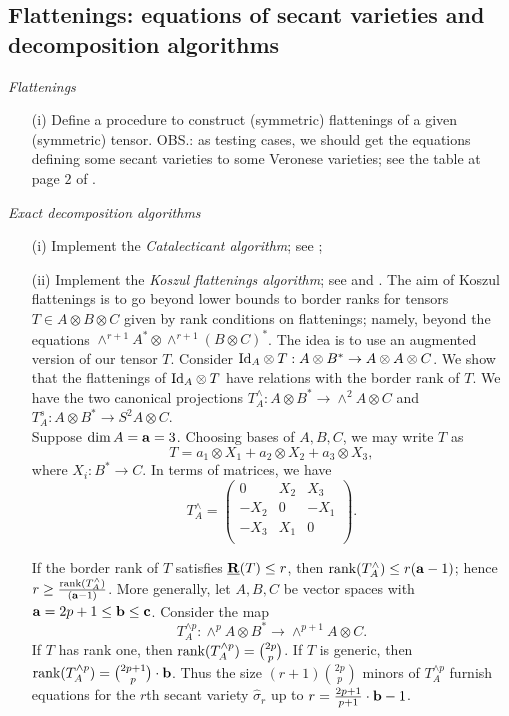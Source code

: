 \documentclass[11pt]{extarticle}
\theoremstyle{definition}
\theoremstyle{remark}
\theoremstyle{definition}
\begin{document}
\subsection*{Flattenings: equations of secant varieties and decomposition algorithms}
{\it Flattenings}
\begin{itemize}
	\item[(i)] Define a procedure to construct (symmetric) flattenings of a given (symmetric) tensor.
	OBS.: as testing cases, we should get the equations defining some secant varieties to some Veronese varieties; see the table at page $2$ of \cite{LO13}.
\end{itemize}
{\it Exact decomposition algorithms}
\begin{itemize}
	\item[(i)] Implement the {\it Catalecticant algorithm}; see \cite[Section 12.4.1]{Lan12};
	\item[(ii)] Implement the {\it Koszul flattenings algorithm}; see \cite[Section 12.4.2]{Lan12} and \cite{OO13}. 
The aim of Koszul flattenings is to go beyond lower bounds to border ranks for tensors $T\in A\otimes B\otimes C$ given by rank conditions on flattenings; namely, beyond the equations $\wedge^{r+1} A^{*}\otimes \wedge^{r+1}(B\otimes C)^{*}$. The idea is to use an augmented version of our tensor $T$. Consider $\textnormal{Id}_A\otimes T: A\otimes B^{*}\rightarrow A\otimes A\otimes C$. We show that the flattenings of $\textnormal{Id}_A\otimes T$ have relations with the border rank of $T$. We have the two canonical projections $T^{\wedge}_A: A\otimes B^{*}\rightarrow \wedge^2 A\otimes C$ and $T^s_A: A\otimes B^{*}\rightarrow S^2 A\otimes C$. \\
\indent Suppose $\dim A = {\bf a} = 3$. Choosing bases of $A,B,C$, we may write $T$ as 
$$
T = a_1\otimes X_1+a_2\otimes X_2+a_3\otimes X_3,
$$
\noindent where $X_i : B^{*}\rightarrow C$. In terms of matrices, we have 
$$
T^{\wedge}_A=
\begin{pmatrix}
0 & X_2 & X_3 \\
-X_2 & 0 & -X_1 \\
-X_3 & X_1 & 0\\
\end{pmatrix}.
$$

If the border rank of $T$ satisfies $\underline{{\bf R}}(T)\leq r$, then $\textnormal{rank}(T^{\wedge}_A)\leq r({\bf a}-1)$; hence $r\geq \frac{\textnormal{rank}(T^{\wedge}_A)}{({\bf a}-1)}$. More generally, let $A,B,C$ be vector spaces with ${\bf a}=2p+1\leq {\bf b}\leq {\bf c}$. Consider the map
$$
T^{\wedge p}_A: \wedge^p A\otimes B^{*}\rightarrow \wedge^{p+1} A\otimes C.
$$
\noindent If $T$ has rank one, then $\textnormal{rank}(T^{\wedge p}_A) = \binom{2p}{p}$. If $T$ is generic, then $\textnormal{rank}(T^{\wedge p}_A) = \binom{2p+1}{p}\cdot {\bf b}$. Thus the size $(r+1)\binom{2p}{p}$ minors of $T^{\wedge p}_A$ furnish equations for the $r$th secant variety $\hat{\sigma}_r$ up to $r = \frac{2p+1}{p+1}\cdot{\bf b}-1$. 


\end{itemize}
\end{document}
